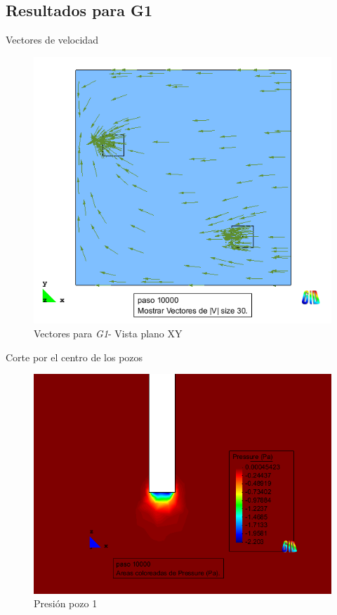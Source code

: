 \documentclass[spanish]{beamer}
\begin{document}
\subsection{Resultados para G1}
\begin{frame}{Vectores de velocidad}
\begin{center}
\begin{figure}[htbp]
\centerline{\includegraphics[scale=0.4]{../img/100m/resul/100_xy_vectores}}
\caption{Vectores para \emph{G1}- Vista plano XY}
\end{figure}
\end{center}
\end{frame}
%
\begin{frame}{Corte por el centro de los pozos}
\begin{center}
\begin{figure}[htbp]
\centerline{\includegraphics[scale=0.3]{../img/100m/resul/100_XZ_presion_corte_centro_pozo1}}
\caption{Presión pozo 1}
\end{figure}
\end{center}
\end{frame}
\end{document}
